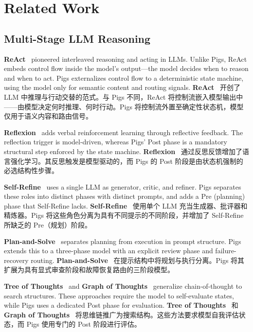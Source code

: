 \section{Related Work}
\label{sec:related}

\subsection{Multi-Stage LLM Reasoning}

\textbf{ReAct}~\citep{yao2022react} pioneered interleaved reasoning and acting in LLMs. Unlike Pigs, ReAct embeds control flow inside the model's output---the model decides when to reason and when to act. Pigs externalizes control flow to a deterministic state machine, using the model only for semantic content and routing signals.
\textbf{ReAct}~\citep{yao2022react} 开创了 LLM 中推理与行动交替的范式。与 Pigs 不同，ReAct 将控制流嵌入模型输出中——由模型决定何时推理、何时行动。Pigs 将控制流外置至确定性状态机，模型仅用于语义内容和路由信号。

\textbf{Reflexion}~\citep{shinn2023reflexion} adds verbal reinforcement learning through reflective feedback. The reflection trigger is model-driven, whereas Pigs' Post phase is a mandatory structural step enforced by the state machine.
\textbf{Reflexion}~\citep{shinn2023reflexion} 通过反思反馈增加了语言强化学习。其反思触发是模型驱动的，而 Pigs 的 Post 阶段是由状态机强制的必选结构性步骤。

\textbf{Self-Refine}~\citep{madaan2023selfrefine} uses a single LLM as generator, critic, and refiner. Pigs separates these roles into distinct phases with distinct prompts, and adds a Pre (planning) phase that Self-Refine lacks.
\textbf{Self-Refine}~\citep{madaan2023selfrefine} 使用单个 LLM 充当生成器、批评器和精炼器。Pigs 将这些角色分离为具有不同提示的不同阶段，并增加了 Self-Refine 所缺乏的 Pre（规划）阶段。

\textbf{Plan-and-Solve}~\citep{wang2023plan} separates planning from execution in prompt structure. Pigs extends this to a three-phase model with an explicit review phase and failure-recovery routing.
\textbf{Plan-and-Solve}~\citep{wang2023plan} 在提示结构中将规划与执行分离。Pigs 将其扩展为具有显式审查阶段和故障恢复路由的三阶段模型。

\textbf{Tree of Thoughts}~\citep{yao2023tot} and \textbf{Graph of Thoughts}~\citep{besta2023got} generalize chain-of-thought to search structures. These approaches require the model to self-evaluate states, while Pigs uses a dedicated Post phase for evaluation.
\textbf{Tree of Thoughts}~\citep{yao2023tot} 和 \textbf{Graph of Thoughts}~\citep{besta2023got} 将思维链推广为搜索结构。这些方法要求模型自我评估状态，而 Pigs 使用专门的 Post 阶段进行评估。

